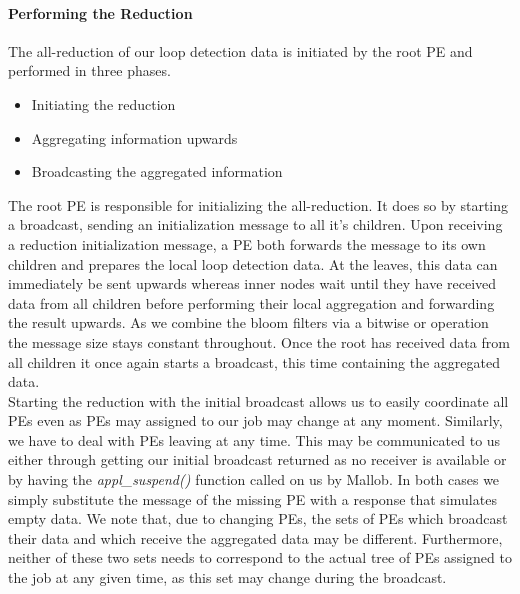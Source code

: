 \paragraph{Performing the Reduction}
The all-reduction of our loop detection data is initiated by the root PE and performed in three phases. 
\begin{itemize}
	\item Initiating the reduction
	\item Aggregating information upwards
	\item Broadcasting the aggregated information
\end{itemize}
The root PE is responsible for initializing the all-reduction. It does so by starting a broadcast, sending an initialization message to all it's children. Upon receiving a reduction initialization message, a PE both forwards the message to its own children and prepares the local loop detection data. At the leaves, this data can immediately be sent upwards whereas inner nodes wait until they have received data from all children before performing their local aggregation and forwarding the result upwards. As we combine the bloom filters via a bitwise or operation the message size stays constant throughout. Once the root has received data from all children it once again starts a broadcast, this time containing the aggregated data. \\
Starting the reduction with the initial broadcast allows us to easily coordinate all PEs even as PEs may assigned to our job may change at any moment. Similarly, we have to deal with PEs leaving at any time. This may be communicated to us either through getting our initial broadcast returned as no receiver is available or by having the \textit{appl\_suspend()} function called on us by Mallob. In both cases we simply substitute the message of the missing PE with a response that simulates empty data. We note that, due to changing PEs, the sets of PEs which broadcast their data and which receive the aggregated data may be different. Furthermore, neither of these two sets needs to correspond to the actual tree of PEs assigned to the job at any given time, as this set may change during the broadcast.

